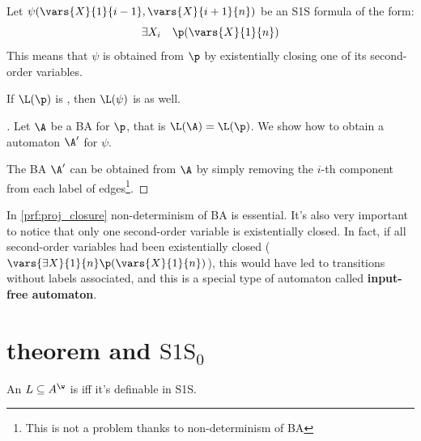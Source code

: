 \documentclass[oneside]{academica}
\begin{document}
\begin{theorem}\label{thm:proj_closure}
  Let $\psi(\vars{X}{1}{i-1},\vars{X}{i+1}{n})$ be an S1S formula of the form:
  \begin{equation*}
    \exists X_i \quad \p(\vars{X}{1}{n})
  \end{equation*}
  This means that $\psi$ is obtained from $\p$ by existentially closing one of its second-order variables.

  \bigskip
  If $\L(\p)$ is \wreg, then $\L(\psi)$ is \wreg as well.
\end{theorem}

\pagebreak

\begin{proof}[]\label{prf:proj_closure}
  Let $\A$ be a BA for $\p$, that is $\L(\A) = \L(\p)$.
  We show how to obtain a \Buchi automaton $\A'$ for $\psi$.

  \begin{center}
    
  \end{center}

  The BA $\A'$ can be obtained from $\A$ by simply removing the $i$-th component from each label of edges\footnote{This is not a problem thanks to non-determinism of BA}.
\end{proof}

In \autoref{prf:proj_closure} non-determinism of BA is essential.
It's also very important to notice that only one second-order variable is existentially closed.
In fact, if all second-order variables had been existentially closed ($\vars{\exists X}{1}{n} \allowbreak \p(\vars{X}{1}{n})$), this would have led to transitions without labels associated, and this is a special type of automaton called \textbf{input-free automaton}.

\section{\Buchi theorem and $\text{S1S}_0$}

\begin{theorem}[\Buchi]\label{thm:buchi}
  An \wlan $L \subseteq \Aw$ is \wreg iff it's definable in S1S.
\end{theorem}
\end{document}
